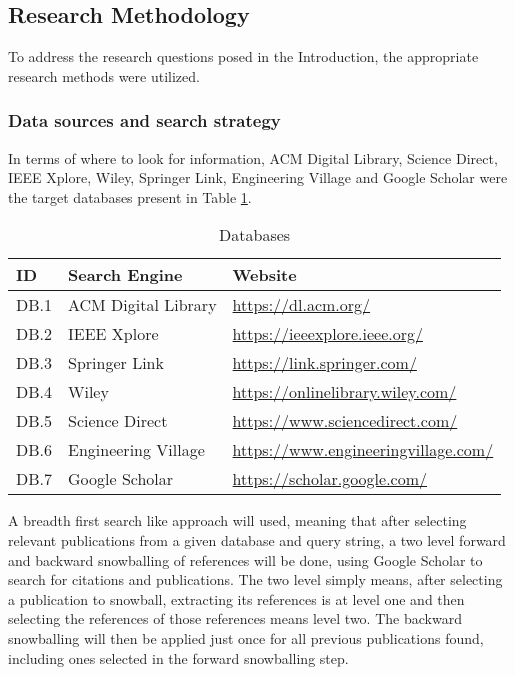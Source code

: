 \documentclass[conference]{IEEEtran}
\begin{document}
\subsection{Research Methodology} \label{sub:research-methodology}



To address the research questions posed in the Introduction, the appropriate
research methods were utilized.

\subsubsection{Data sources and search strategy} \label{sub:search-strategy}

In terms of where to look for information, ACM Digital Library, Science Direct,
IEEE Xplore, Wiley, Springer Link, Engineering Village and Google Scholar were
the target databases present in Table \ref{tab:databases}.

\begin{table}[H] \caption{Databases} \label{tab:databases}
  \begin{center}
    \begin{tabular}[c]{l|l|l} \textbf{ID} & \textbf{Search Engine} &
      \textbf{Website} \\
      \hline DB.1 & ACM Digital Library & \url{https://dl.acm.org/} \\
      \hline DB.2 & IEEE Xplore & \url{https://ieeexplore.ieee.org/} \\
      \hline DB.3 & Springer Link & \url{https://link.springer.com/} \\
      \hline DB.4 & Wiley & \url{https://onlinelibrary.wiley.com/} \\
      \hline DB.5 & Science Direct & \url{https://www.sciencedirect.com/} \\
      \hline DB.6 & Engineering Village &
      \url{https://www.engineeringvillage.com/} \\
      \hline DB.7 & Google Scholar & \url{https://scholar.google.com/} \\
    \end{tabular}
  \end{center}
\end{table}



A breadth first search like approach will used, meaning that after selecting
relevant publications from a given database and query string, a two level
forward and backward snowballing of references will be done, using Google
Scholar to search for citations and publications. The two level simply means,
after selecting a publication to snowball, extracting its references is at
level one and then selecting the references of those references means level
two. The backward snowballing will then be applied just once for all previous
publications found, including ones selected in the forward snowballing step.
\end{document}
